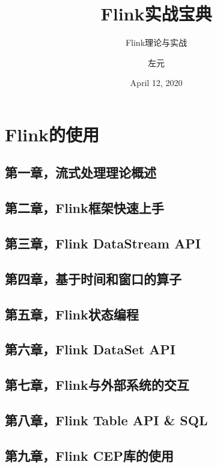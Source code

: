 \documentclass[cn,11pt,chinese]{elegantbook}
\title{Flink实战宝典}
\subtitle{Flink理论与实战}
\author{左元}
\institute{尚硅谷}
\date{April 12, 2020}
\begin{document}
\maketitle
\frontmatter

\tableofcontents

\part{Flink的使用}

\chapter{第一章，流式处理理论概述}

\chapter{第二章，Flink框架快速上手}

\chapter{第三章，Flink DataStream API}

\chapter{第四章，基于时间和窗口的算子}

\chapter{第五章，Flink状态编程}

\chapter{第六章，Flink DataSet API}

\chapter{第七章，Flink与外部系统的交互}

\chapter{第八章，Flink Table API \& SQL}

\chapter{第九章，Flink CEP库的使用}
\end{document}

